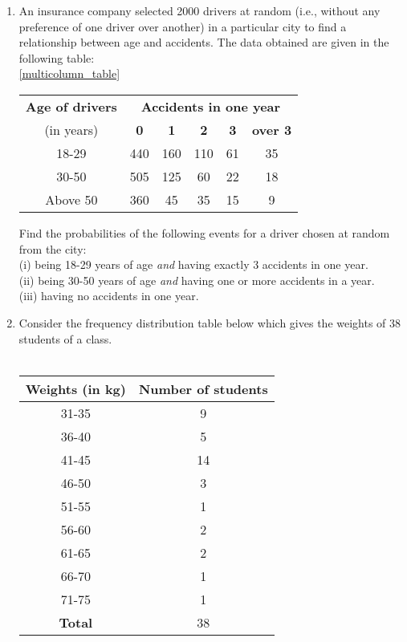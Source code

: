 \documentclass[journal,12pt,twocolumn]{IEEEtran}
\begin{document}
\begin{enumerate}[label=\arabic*]
Based on this data, find the probability that the student gets more than 70$\%$ marks in a unit test.\\
\item An insurance company selected 2000 drivers at random (i.e., without
any preference of one driver over another) in a particular city to find a relationship between age and accidents. The data obtained are given in the following table:\\
\ref{multicolumn_table}
\begin{table}
\centering
\begin{tabular}{|c|c|c|c|c|c|}
\hline
\textbf{Age of drivers} &\multicolumn{5}{c|}{\textbf{Accidents in one year }}\\
\cline{2-6}
(in years) &\textbf{0} &\textbf{1} &\textbf{2} &\textbf{3} &\textbf{over 3}\\
\hline
18-29 &440 &160 &110 &61 &35\\
\hline
30-50 &505 &125 &60 &22 &18\\
\hline
Above 50 &360 &45 &35 &15 &9\\
\hline
\end{tabular}

\end{table}

Find the probabilities of the following events for a driver chosen at random from the city:\\
(i) being 18-29 years of age \textit{and} having exactly 3 accidents in one year.\\
(ii) being 30-50 years of age \textit{and} having one or more accidents in a year.\\
(iii) having no accidents in one year.\\

\item Consider the frequency distribution table below which gives the weights of 38 students of a class.\\
\\
\begin{tabular}{ |c|c| } 
 \hline
 \textbf{Weights (in kg)} &\textbf{Number of students }\\ 
 \hline
 31-35 &9\\
 36-40 &5\\
 41-45 &14\\
 46-50 &3\\
 51-55 &1\\
 56-60 &2\\
 61-65 &2\\
 66-70 &1\\
 71-75 &1\\
 \hline
 \textbf{Total} &38\\
 \hline
\end{tabular}\\


\end{enumerate}
\end{document}
